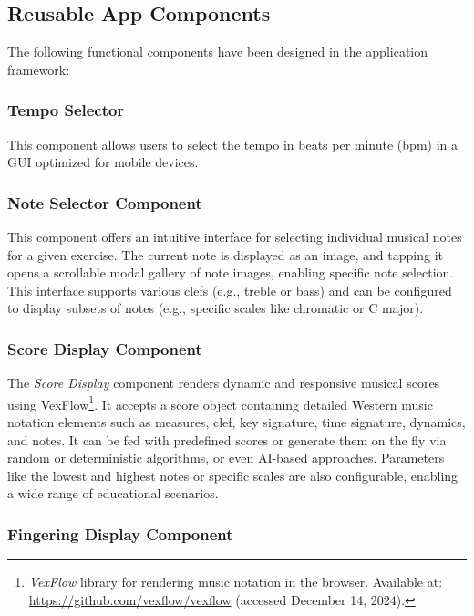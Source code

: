 \documentclass[runningheads]{llncs}
\begin{document}
\subsection{Reusable App Components\label{sec:components}}

The following functional components have been designed in the application framework:


\subsubsection{Tempo Selector\label{sec:metronome}}

This component allows users to select the tempo in beats per minute (bpm) in a GUI optimized for mobile devices.


\subsubsection{Note Selector Component}

This component offers an intuitive interface for selecting individual musical notes for a given exercise. The current note is displayed as an image, and tapping it opens a scrollable modal gallery of note images, enabling specific note selection.
This interface supports various clefs (e.g., treble or bass) and can be configured to display subsets of notes (e.g., specific scales like chromatic or C major).


\subsubsection{Score Display Component}

The \textit{Score Display} component renders dynamic and responsive musical scores using VexFlow\footnote{\textit{VexFlow} library for rendering music notation in the browser. Available at: \url{https://github.com/vexflow/vexflow} (accessed December 14, 2024).}. It accepts a score object containing detailed Western music notation elements such as measures, clef, key signature, time signature, dynamics, and notes. It can be fed with predefined scores or generate them on the fly via random or deterministic algorithms, or even AI-based approaches. Parameters like the lowest and highest notes or specific scales are also configurable, enabling a wide range of educational scenarios.


\subsubsection{Fingering Display Component}
\end{document}
